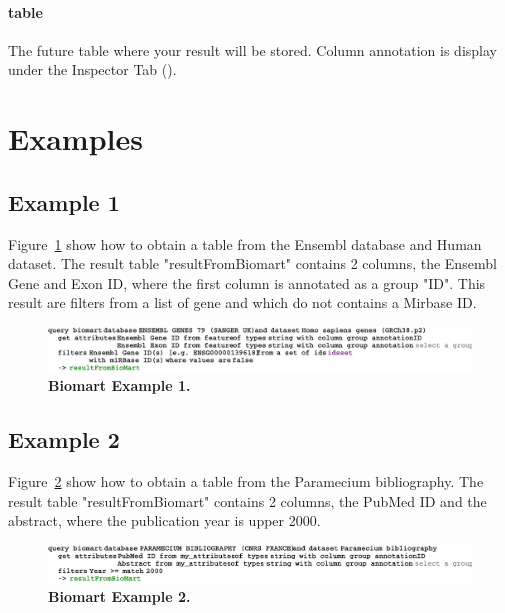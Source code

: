 \paragraph{table}
The future table where your result will be stored. Column annotation is display under the Inspector Tab (\inspectorTabIcon).
\section{Examples}
\subsection{Example 1}
Figure~\ref{fig:BiomartExample1} show how to obtain a table from the Ensembl database and Human dataset. The result table "resultFromBiomart" contains 2 columns, the Ensembl Gene and Exon ID, where the first column is annotated as a group "ID". This result are filters from a list of gene and which do not contains a Mirbase ID.
 \begin{figure}[h!tbp]
  \centering
  \includegraphics[width=\figWidthWide]{figures/BiomartExample1.pdf}
\caption[Biomart Example 1]{\textbf{ Biomart Example 1.}}
\label{fig:BiomartExample1}
\end{figure}

\subsection{Example 2}
Figure~\ref{fig:BiomartExample2} show how to obtain a table from the Paramecium bibliography. The result table "resultFromBiomart" contains 2 columns, the PubMed ID and the abstract, where the publication year is upper 2000.
 \begin{figure}[h!tbp]
  \centering
  \includegraphics[width=\figWidthWide]{figures/BiomartExample2.pdf}
\caption[Biomart Example 2]{\textbf{ Biomart Example 2.}}
\label{fig:BiomartExample2}
\end{figure}
